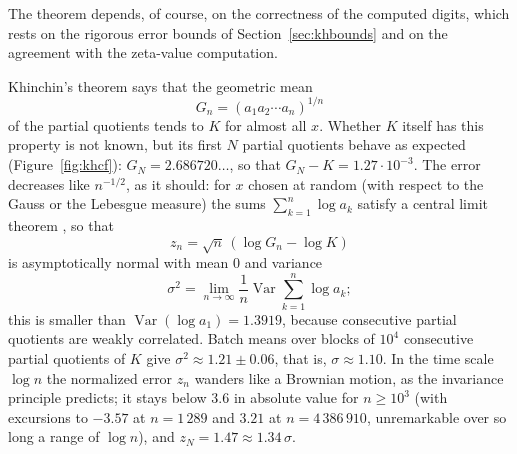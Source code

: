 \documentclass[11pt,reqno]{amsart}
\theoremstyle{definition}
\theoremstyle{remark}
\begin{document}
The theorem depends, of course, on the correctness of the computed digits, which rests on the rigorous error bounds
of Section~\ref{sec:khbounds} and on the agreement with the zeta-value computation.

Khinchin's theorem \cite{Khi35} says that the geometric mean
\[
  G_n = (a_1a_2\cdots a_n)^{1/n}
\]
of the partial quotients tends to $K$ for almost all $x$. Whether $K$ itself has this property is not known, but its first $N$ partial
quotients behave as expected (Figure~\ref{fig:khcf}): $G_N = 2.686720\ldots$, so that $G_N - K = 1.27\cdot10^{-3}$. The
error decreases like $n^{-1/2}$, as it should: for $x$ chosen at random (with respect to the Gauss or the Lebesgue
measure) the sums $\sum_{k=1}^{n}\log a_k$ satisfy a central limit theorem \cite{IK02}, so that
\[
  z_n = \sqrt n\,(\log G_n - \log K)
\]
is asymptotically normal with mean $0$ and variance
\[
  \sigma^2 = \lim_{n\to\infty}\frac1n\operatorname{Var}\sum_{k=1}^{n}\log a_k;
\]
this is smaller than
$\operatorname{Var}(\log a_1) = 1.3919$, because consecutive partial quotients are weakly correlated. Batch means over
blocks of $10^4$ consecutive partial quotients of $K$ give $\sigma^2 \approx 1.21 \pm 0.06$, that is,
$\sigma \approx 1.10$. In the time scale $\log n$ the normalized error $z_n$ wanders like a Brownian motion, as the
invariance principle predicts; it stays below $3.6$ in absolute value for $n \ge 10^3$ (with excursions to $-3.57$ at
$n = 1\,289$ and $3.21$ at $n = 4\,386\,910$, unremarkable over so long a range of $\log n$), and
$z_N = 1.47 \approx 1.34\,\sigma$.
\end{document}
